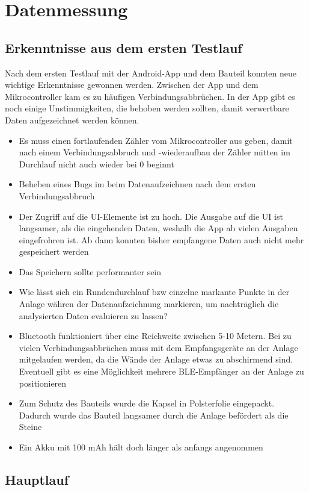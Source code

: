 \section{Datenmessung}

\subsection{Erkenntnisse aus dem ersten Testlauf}
Nach dem ersten Testlauf mit der Android-App und dem Bauteil konnten neue wichtige Erkenntnisse gewonnen werden.
Zwischen der App und dem Mikrocontroller kam es zu häufigen Verbindungsabbrüchen. In der App gibt es noch einige Unstimmigkeiten, die behoben werden sollten, damit verwertbare Daten aufgezeichnet werden können. 

\begin{itemize}
	\item Es muss einen fortlaufenden Zähler vom Mikrocontroller aus geben, damit nach einem Verbindungsabbruch und -wiederaufbau der Zähler mitten im Durchlauf nicht auch wieder bei 0 beginnt
	\item Beheben eines Bugs im beim Datenaufzeichnen nach dem ersten Verbindungsabbruch
	\item Der Zugriff auf die UI-Elemente ist zu hoch. Die Ausgabe auf die UI ist langsamer, als die eingehenden Daten, weshalb die App ab vielen Ausgaben eingefrohren ist. Ab dann konnten bisher empfangene Daten auch nicht mehr gespeichert werden
	\item Das Speichern sollte performanter sein
	\item Wie lässt sich ein Rundendurchlauf bzw einzelne markante Punkte in der Anlage währen der Datenaufzeichnung markieren, um nachträglich die analysierten Daten evaluieren zu lassen?
	\item Bluetooth funktioniert über eine Reichweite zwischen 5-10 Metern. Bei zu vielen Verbindungsabbrüchen muss mit dem Empfangsgeräte an der Anlage mitgelaufen werden, da die Wände der Anlage etwas zu abschirmend sind. Eventuell gibt es eine Möglichkeit mehrere BLE-Empfänger an der Anlage zu positionieren
	\item Zum Schutz des Bauteils wurde die Kapsel in Polsterfolie eingepackt. Dadurch wurde das Bauteil langsamer durch die Anlage befördert als die Steine
	\item Ein Akku mit 100 mAh hält doch länger als anfangs angenommen
\end{itemize}

\subsection{Hauptlauf}

